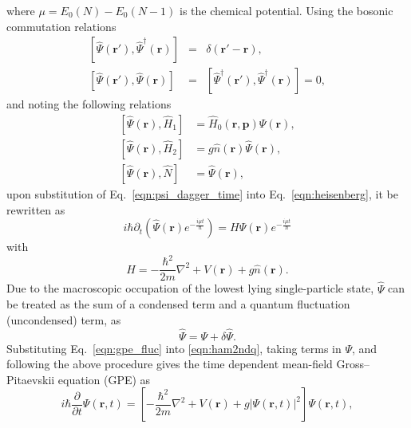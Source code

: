 where $\mu=E_0(N) - E_0(N-1)$ is the chemical potential. Using the bosonic commutation relations
\begin{eqnarray}
\left[\hat{\Psi}(\textbf{r}'), \hat{\Psi}^{\dagger}(\textbf{r})\right] &=& \delta(\textbf{r}' - \textbf{r}), \\
\left[\hat{\Psi}(\textbf{r}'), \hat{\Psi}(\textbf{r})\right] &=& \left[\hat{\Psi}^{\dagger}(\textbf{r}'), \hat{\Psi}^{\dagger}(\textbf{r})\right] = 0,
\end{eqnarray}
and noting the following relations
\begin{align}
\left[\hat{\Psi}(\textbf{r}),\hat{H}_1 \right] & = \hat{H}_0(\textbf{r},\textbf{p})\hat{\Psi}(\textbf{r}), \\
\left[\hat{\Psi}(\textbf{r}),\hat{H}_2 \right] & = g\hat{n}(\textbf{r})\hat{\Psi}(\textbf{r}), \\
\left[\hat{\Psi}(\textbf{r}),\hat{N} \right] & = \hat{\Psi}(\textbf{r}) ,
\end{align}
upon substitution of Eq.~\ref{eqn:psi_dagger_time} into Eq.~\ref{eqn:heisenberg}, it be rewritten as
\begin{equation}\label{eqn:almost_gpe}
    i \hbar \partial_t \left( \hat{\Psi}(\textbf{r}) e^{-\frac{i\mu t}{\hbar}} \right) = H \hat{\Psi}(\textbf{r}) e^{-\frac{i\mu t}{\hbar}}
\end{equation}
with
\begin{equation}\label{eqn:h_many}
H =  -\frac{\hbar^2}{2m}\nabla^2  + V(\textbf{r}) + g\hat{n}(\textbf{r}).
\end{equation}
Due to the macroscopic occupation of the lowest lying single-particle state, $\hat{\Psi}$ can be treated as the sum of a condensed term and a quantum fluctuation (uncondensed) term, as
\begin{equation}\label{eqn:gpe_fluc}
    \hat{\Psi} = \Psi + \delta\hat{\Psi}.
\end{equation}
Substituting Eq.~\ref{eqn:gpe_fluc} into \ref{eqn:ham2ndq}, taking terms in $\Psi$, and following the above procedure gives the time dependent mean-field Gross--Pitaevskii equation (GPE) as
\begin{equation}\label{eqn:gpe}
i\hbar\frac{\partial}{\partial t}\Psi(\textbf{r},t) = \left[-\frac{\hbar^2}{2m}\nabla^2 + V(\textbf{r}) + g\vert\Psi(\textbf{r},t)\vert^2 \right]\Psi(\textbf{r},t),
\end{equation}
